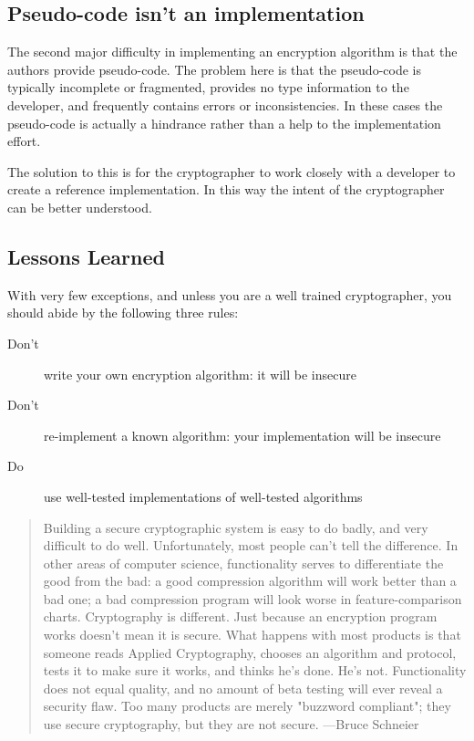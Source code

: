 \subsection{Pseudo-code isn't an implementation}
The second major difficulty in implementing an encryption algorithm is that the authors provide pseudo-code. The problem here is that the pseudo-code is typically incomplete or fragmented, provides no type information to the developer, and frequently contains errors or inconsistencies. In these cases the pseudo-code is actually a hindrance rather than a help to the implementation effort.

The solution to this is for the cryptographer to work closely with a developer to create a reference implementation. In this way the intent of the cryptographer can be better understood.

\subsection{Lessons Learned}

With very few exceptions, and unless you are a well trained cryptographer, you should abide by the following three rules:

\begin{description}
\item[Don't] write your own encryption algorithm: it will be insecure
\item[Don't] re-implement a known algorithm: your implementation will be insecure
\item [Do] use well-tested implementations of well-tested algorithms
\end{description}

\blockquote[\cite{Schneier:Pitfalls}]{Building a secure cryptographic system is easy to do badly, and very difficult to do well. Unfortunately, most people can't tell the difference. In other areas of computer science, functionality serves to differentiate the good from the bad: a good compression algorithm will work better than a bad one; a bad compression program will look worse in feature-comparison charts. Cryptography is different. Just because an encryption program works doesn't mean it is secure. What happens with most products is that someone reads Applied Cryptography, chooses an algorithm and protocol, tests it to make sure it works, and thinks he's done. He's not. Functionality does not equal quality, and no amount of beta testing will ever reveal a security flaw. Too many products are merely "buzzword compliant"; they use secure cryptography, but they are not secure. ---Bruce Schneier}

